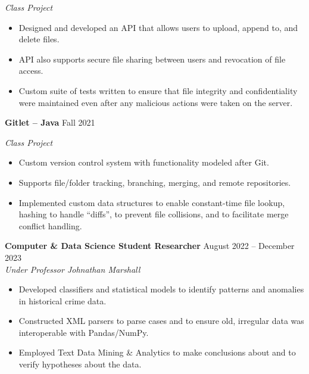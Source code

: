 \documentclass{article}
\begin{document}
\begin{adjustwidth}{1em}{1em}
    \textit{Class Project}
    \begin{itemize}
        \item Designed and developed an API that allows users to upload, append to, and delete files.
        \item API also supports secure file sharing between users and revocation of file access.
        \item Custom suite of tests written to ensure that file integrity and confidentiality were maintained even after any malicious actions were taken on the server.
    \end{itemize}

    \vspace{1mm}

    \textbf{Gitlet -- Java} \hfill Fall 2021

    \textit{Class Project}
    \begin{itemize}
        \item Custom version control system with functionality modeled after Git.
        \item Supports file/folder tracking, branching, merging, and remote repositories.
        \item Implemented custom data structures to enable constant-time file lookup, hashing to handle ``diffs'', to prevent file collisions, and to facilitate merge conflict handling.
    \end{itemize}


    


\end{adjustwidth}



\begin{adjustwidth}{1em}{1em}

    \textbf{Computer \& Data Science Student Researcher} \hfill August 2022 -- December 2023 \\
    \textit{Under Professor Johnathan Marshall}
    \begin{itemize}
        \item Developed classifiers and statistical models to identify patterns and anomalies in historical crime data.
        \item Constructed XML parsers to parse cases and to ensure old, irregular data was interoperable with Pandas/NumPy.
        \item Employed Text Data Mining \& Analytics to make conclusions about and to verify hypotheses about the data.
    \end{itemize}

    \vspace{1mm}

\end{adjustwidth}



\end{document}
